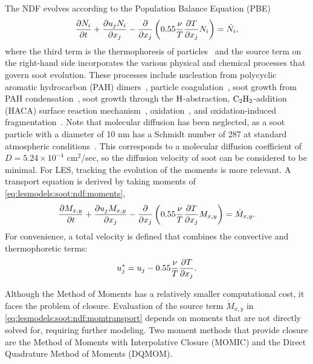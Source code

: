 The NDF evolves according to the Population Balance Equation (PBE)~\cite{friedlander2000}
\begin{equation}\label{eq:lesmodels:soot:ndf:pbe}
  \tder{N_i} - \pder[]{x_j}\left( 0.55\frac{\nu}{T}\pder[T]{x_j}N_i \right) = \dot{N_i},
\end{equation}
where the third term is the thermophoresis of particles~\cite{waldmann1966} and the source term on the right-hand side incorporates the various physical and chemical processes that govern soot evolution. These processes include nucleation from polycyclic aromatic hydrocarbon (PAH) dimers~\cite{blanquart2009,schuetz2002,frenklach1991,wang2011}, particle coagulation~\cite{kazakov1998,hmom2009}, soot growth from PAH condensation~\cite{blanquart2009,hmom2009}, soot growth through the $\ce{H}$-abstraction, $\ce{C2H2}$-addition (HACA) surface reaction mechanism~\cite{frenklach1985,frenklach1991}, oxidation~\cite{stanmore2001,neoh1981,kazakov1995}, and oxidation-induced fragmentation~\cite{neoh1984,mueller2011}. Note that molecular diffusion has been neglected, as a soot particle with a diameter of 10 nm has a Schmidt number of 287 at standard atmospheric conditions~\cite{friedlander2000}. This corresponds to a molecular diffusion coefficient of $D = 5.24\times 10^{-4}$ cm$^2$/sec, so the diffusion velocity of soot can be considered to be minimal. For LES, tracking the evolution of the moments is more relevant. A transport equation is derived by taking moments of \cref{eq:lesmodels:soot:ndf:moments},
\begin{equation}\label{eq:lesmodels:soot:ndf:momtransport}
  \tder{M_{x,y}} - \pder[]{x_j}\left( 0.55\frac{\nu}{T}\pder[T]{x_j}M_{x,y} \right) = \dot{M}_{x,y}.
\end{equation}
For convenience, a total velocity is defined that combines the convective and thermophoretic terms:
\begin{equation}\label{eq:lesmodels:soot:ndf:totvel}
  u_j^* = u_j - 0.55\frac{\nu}{T}\pder[T]{x_j}.
\end{equation}

Although the Method of Moments has a relatively smaller computational cost, it faces the problem of closure. Evaluation of the source term $\dot{M}_{x,y}$ in \cref{eq:lesmodels:soot:ndf:momtransport} depends on moments that are not directly solved for, requiring further modeling. Two moment methods that provide closure are the Method of Moments with Interpolative Closure (MOMIC) and the Direct Quadrature Method of Moments (DQMOM).

